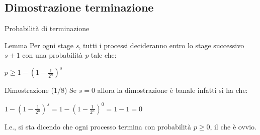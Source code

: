 \documentclass{beamer}
\begin{document}
\subsection{Dimostrazione terminazione}

\begin{frame}{Probabilità di terminazione}
    \begin{block}{Lemma}
        Per ogni stage \textit{s}, tutti i processi decideranno entro lo stage successivo $s+1$ con una probabilità \textit{p} tale che:
        \begin{center}
        \huge
            $p \geq 1 - (1-\frac{1}{2^n})^s$
        \end{center}
    \end{block}
\end{frame}

\begin{frame}{Dimostrazione (1/8)}
    Se $s = 0$ allora la dimostrazione è banale infatti si ha che:
    \vspace{0.3cm}
    \begin{center}
        \Large
        $1 - (1 - \frac{1}{2^n})^s = 1 - (1 - \frac{1}{2^n})^0 = 1 - 1 = 0$
    \end{center}
    \normalsize
    \vspace{0.3cm}
    I.e., si sta dicendo che ogni processo termina con probabilità $p \geq 0$, il che è ovvio.
\end{frame}
\end{document}

